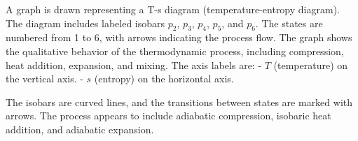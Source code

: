 A graph is drawn representing a T-s diagram (temperature-entropy diagram). The diagram includes labeled isobars \( p_2 \), \( p_3 \), \( p_4 \), \( p_5 \), and \( p_6 \). The states are numbered from 1 to 6, with arrows indicating the process flow. The graph shows the qualitative behavior of the thermodynamic process, including compression, heat addition, expansion, and mixing. The axis labels are:  
- \( T \) (temperature) on the vertical axis.  
- \( s \) (entropy) on the horizontal axis.  

The isobars are curved lines, and the transitions between states are marked with arrows. The process appears to include adiabatic compression, isobaric heat addition, and adiabatic expansion.